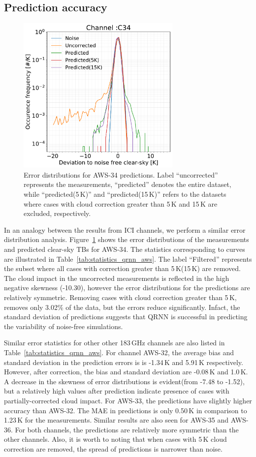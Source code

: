 \documentclass[amt, manuscript]{copernicus}
\begin{document}
\subsection{Prediction accuracy}
\begin{figure}[t]
	\includegraphics[width = 80mm]{Figures/AWS-34_single.pdf}	
	\caption{Error distributions for AWS-34 predictions. Label ``uncorrected'' represents the measurements, ``predicted'' denotes the entire dataset, while ``predicted(5\,K)'' and  ``predicted(15\,K)''  refers to the datasets where cases with cloud correction greater than 5\,K and 15\,K are excluded, respectively.}
	\label{fig:qrnn_C34_deviations}	
\end{figure}
In an analogy between the results from ICI channels, we perform a similar error distribution analysis. Figure~\ref{fig:qrnn_C34_deviations} shows the error distributions of the measurements and predicted clear-sky TBs for AWS-34. The statistics corresponding to curves are illustrated in Table~\ref{tab:statistics_qrnn_aws}. The label ``Filtered'' represents the subset where all cases with correction greater than 5\,K(15\,K) are removed. The cloud impact in the uncorrected measurements is reflected in the high negative skewness (-10.30), however the  error distributions for the predictions are relatively symmetric. Removing cases with cloud correction greater than 5\,K, removes only 3.02\% of the data, but the errors reduce significantly. Infact, the standard deviation of predictions suggests that QRNN is successful in predicting the variability of noise-free simulations. 

Similar error statistics for other other 183\,GHz channels are also listed in Table~\ref{tab:statistics_qrnn_aws}. For channel AWS-32, the average bias and standard deviation in the prediction errors is is -1.34\,K and 5.91\,K respectively. However, after correction, the bias and standard deviation are -0.08\,K and 1.0\,K. A decrease in the skewness of error distributions is evident(from -7.48 to -1.52), but a relatively high values after prediction indicate presence of cases with partially-corrected cloud impact. For AWS-33, the predictions have slightly higher accuracy than AWS-32. The MAE in predictions is only 0.50\,K in comparison to 1.23\,K for the measurements. Similar results are also seen for AWS-35 and AWS-36. For both channels, the predictions are relatively more symmetric than the other channels. Also, it is worth to noting that when cases with 5\,K cloud correction are removed, the spread of predictions is narrower than noise. 
\end{document}
